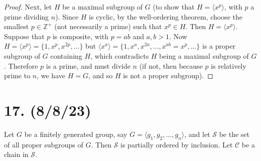 \documentclass{article}
\begin{document}
\begin{enumerate}[label=(\alph*), itemsep=0em]
\begin{proof}
            Next, let $H$ be a maximal subgroup of $G$ (to show that $H = \langle x^p \rangle$, with $p$ a prime dividing $n$). Since $H$ is cyclic, by the well-ordering theorem, choose the smallest $p \in \mathbb{Z}^+$ (not necessarily a prime) such that $x^p \in H$. Then $H = \langle x^p \rangle$. Suppose that $p$ is composite, with $p = ab$ and $a, b > 1$. Now $H = \langle x^p \rangle = \{ 1, x^p, x^{2p}, ... \}$ but $\langle x^a \rangle = \{ 1, x^a, x^{2a}, ..., x^{ab} = x^p, ... \}$ is a proper subgroup of $G$ containing $H$, which contradicts $H$ being a maximal subgroup of $G$. Therefore $p$ is a prime, and must divide $n$ (if not, then because $p$ is relatively prime to $n$, we have $H = G$, and so $H$ is not a proper subgroup).
          \end{proof}
\end{enumerate}

\section*{17. (8/8/23)}

Let $G$ be a finitely generated group, say $G = \langle g_1, g_2, ..., g_n \rangle$, and let $\mathcal{S}$ be the set of all proper subgroups of $G$. Then $\mathcal{S}$ is partially ordered by inclusion. Let $\mathcal{C}$ be a chain in $\mathcal{S}$.
\end{document}
